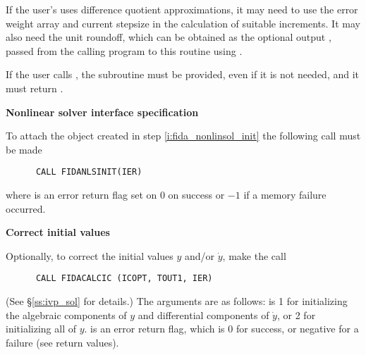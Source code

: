 \begin{Steps}
  If the user's  uses difference quotient approximations, it
  may need to use the error weight array  and current stepsize 
  in the calculation of suitable increments.  It may also need the unit
  roundoff, which can be obtained as the optional output ,
  passed from the calling program to this routine using .

  {\warn} If the user calls , the subroutine 
  must be provided, even if it is not needed, and it must return .

\item\label{i:fida_nonlin_solv_spec} {\bf Nonlinear solver interface specification}

  To attach the {\sunnonlinsolnewton} object created in step
  \ref{i:fida_nonlinsol_init} the following call must be made
\begin{verbatim}
      CALL FIDANLSINIT(IER)
\end{verbatim}
  where  is an error return flag set on $0$ on success or $-1$
  if a memory failure occurred.

\item {\bf Correct initial values}

  Optionally, to correct the initial values $y$ and/or $\dot{y}$, make the call
\begin{verbatim}
      CALL FIDACALCIC (ICOPT, TOUT1, IER)
\end{verbatim}
  (See \S\ref{ss:ivp_sol} for details.)  The arguments are as follows:
   is 1 for initializing the algebraic components of $y$ and
  differential components of $\dot{y}$, or 2 for initializing all of $y$.
   is an error return flag, which is 0 for success, or negative
  for a failure (see  return values).




\end{Steps}
